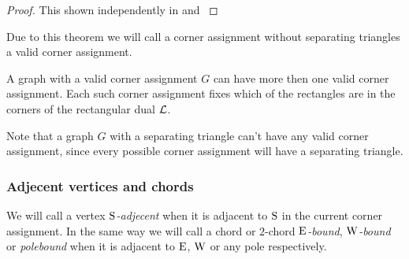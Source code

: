   \begin{proof}
    This shown independently in \cite{Kozminski1984} and  \cite{Ungar1953}
  \end{proof}

  Due to this theorem we will call a corner assignment without separating triangles a valid corner assignment.

  A graph with a valid corner assignment $G$ can have more then one valid corner assignment. Each such corner assignment fixes which of the rectangles are in the corners of the rectangular dual $\mathcal{L}$.

  Note that a graph $G$ with a separating triangle can't have any valid corner assignment, since every possible corner assignment will have a separating triangle.

  \subsubsection{Adjecent vertices and chords}
  We will call a vertex \emph{$\mathrm{S}$-adjecent} when it is adjacent to $\mathrm{S}$ in the current corner assignment. In the same way we will call a chord or $2$-chord \emph{$\mathrm{E}$-bound}, \emph{$\mathrm{W}$-bound} or \emph{polebound} when it is adjacent to $\mathrm{E}$, $\mathrm{W}$ or any pole respectively.
